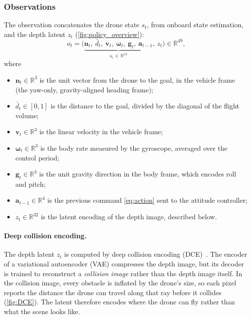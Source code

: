 \subsubsection{Observations}
\label{subsec:observations}
The observation concatenates the drone state $s_t$, from onboard state estimation, and the depth latent $z_t$ (\autoref{fig:policy_overview}):
\begin{equation}
    o_t = \big(\underbrace{\mathbf{n}_t,\ \bar{d}_t,\ \mathbf{v}_t,\ \boldsymbol{\omega}_t,\ \mathbf{g}_t,\ \mathbf{a}_{t-1}}_{s_t \,\in\, \mathbb{R}^{17}},\ z_t\big) \in \mathbb{R}^{49},
    \label{eq:drone_state}
\end{equation}
where
\begin{itemize}
    \item $\mathbf{n}_t \in \mathbb{R}^3$ is the unit vector from the drone to the goal, in the vehicle frame (the yaw-only, gravity-aligned heading frame);
    \item $\bar{d}_t \in [0, 1]$ is the distance to the goal, divided by the diagonal of the flight volume;
    \item $\mathbf{v}_t \in \mathbb{R}^3$ is the linear velocity in the vehicle frame;
    \item $\boldsymbol{\omega}_t \in \mathbb{R}^3$ is the body rate measured by the gyroscope, averaged over the control period;
    \item $\mathbf{g}_t \in \mathbb{R}^3$ is the unit gravity direction in the body frame, which encodes roll and pitch;
    \item $\mathbf{a}_{t-1} \in \mathbb{R}^4$ is the previous command \eqref{eq:action} sent to the attitude controller;
    \item $z_t \in \mathbb{R}^{32}$ is the latent encoding of the depth image, described below.
\end{itemize}

\paragraph{Deep collision encoding.}
\label{subsec:dce}
The depth latent $z_t$ is computed by deep collision encoding (DCE)~\cite{kulkarniReinforcementLearningCollisionfree2024,kulkarniTaskdrivenCompressionCollision2023}. The encoder of a variational autoencoder (VAE) compresses the depth image, but its decoder is trained to reconstruct a \emph{collision image} rather than the depth image itself. In the collision image, every obstacle is inflated by the drone's size, so each pixel reports the distance the drone can travel along that ray before it collides (\autoref{fig:DCE}). The latent therefore encodes where the drone can fly rather than what the scene looks like.

